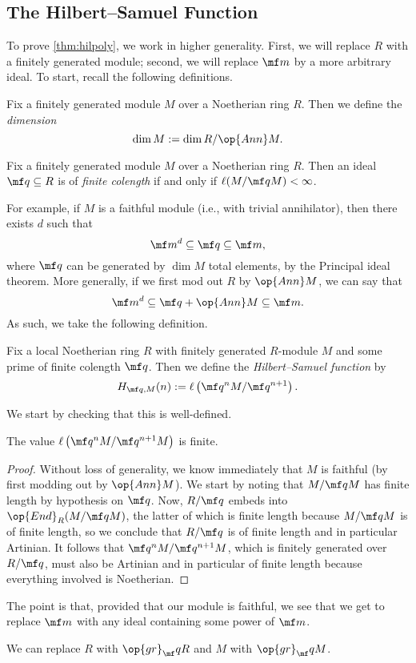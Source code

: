 \documentclass[../notes.tex]{subfiles}
\begin{document}
\subsection{The Hilbert--Samuel Function}
To prove \autoref{thm:hilpoly}, we work in higher generality. First, we will replace $R$ with a finitely generated module; second, we will replace $\mf m$ by a more arbitrary ideal. To start, recall the following definitions.
\begin{definition}
	Fix a finitely generated module $M$ over a Noetherian ring $R$. Then we define the \textit{dimension}
	\[\dim M:=\dim R/\op{Ann}M.\]
\end{definition}
\begin{definition}
	Fix a finitely generated module $M$ over a Noetherian ring $R$. Then an ideal $\mf q\subseteq R$ is of \textit{finite colength} if and only if $\ell(M/\mf qM)<\infty$.
\end{definition}
For example, if $M$ is a faithful module (i.e., with trivial annihilator), then there exists $d$ such that
\[\mf m^d\subseteq\mf q\subseteq\mf m,\]
where $\mf q$ can be generated by $\dim M$ total elements, by the Principal ideal theorem. More generally, if we first mod out $R$ by $\op{Ann}M$, we can say that
\[\mf m^d\subseteq\mf q+\op{Ann}M\subseteq\mf m.\]
As such, we take the following definition.
\begin{definition}
	Fix a local Noetherian ring $R$ with finitely generated $R$-module $M$ and some prime of finite colength $\mf q$. Then we define the \textit{Hilbert--Samuel function} by
	\[H_{\mf q,M}(n):=\ell\left(\mf q^nM/\mf q^{n+1}\right).\]
\end{definition}
We start by checking that this is well-defined.
\begin{lemma}
	The value $\ell\left(\mf q^nM/\mf q^{n+1}M\right)$ is finite.
\end{lemma}
\begin{proof}
	Without loss of generality, we know immediately that $M$ is faithful (by first modding out by $\op{Ann}M$). We start by noting that $M/\mf qM$ has finite length by hypothesis on $\mf q$. Now, $R/\mf q$ embeds into $\op{End}_R(M/\mf qM)$, the latter of which is finite length because $M/\mf qM$ is of finite length, so we conclude that $R/\mf q$ is of finite length and in particular Artinian. It follows that $\mf q^nM/\mf q^{n+1}M$, which is finitely generated over $R/\mf q$, must also be Artinian and in particular of finite length because everything involved is Noetherian.
\end{proof}
The point is that, provided that our module is faithful, we see that we get to replace $\mf m$ with any ideal containing some power of $\mf m$.
\begin{remark}
	We can replace $R$ with $\op{gr}_\mf qR$ and $M$ with $\op{gr}_\mf qM$.
\end{remark}
\end{document}
